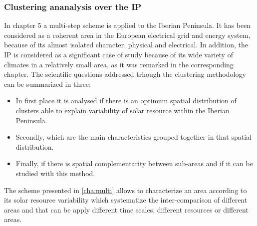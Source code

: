

\subsubsection{Clustering ananalysis over the IP}

In chapter 5 a multi-step scheme is applied to the Iberian Peninsula. It has been considered as a coherent area in the European electrical grid and energy system, because of its almost isolated character, physical and electrical. In addition, the IP is considered as a significant case of study because of its wide variety of climates in a relatively small area, as it was remarked in the corresponding chapter. The scientific questions addressed trhough the clustering methodology can be summarized in three:

\begin{itemize}
  
\item In first place it is analysed if there is an optimum spatial distribution of clusters able to explain variability of solar resource within the Iberian Peninsula.

\item Secondly, which are the main characteristics grouped together in that spatial distribution.

\item Finally, if there is spatial complementarity between sub-areas and if it can be studied with this method.

\end{itemize}

The scheme presented in \ref{cha:multi} allows to characterize an area according to its solar resource variability which systematize the inter-comparison of different areas and that can be apply different time scales, different resources or different areas.


